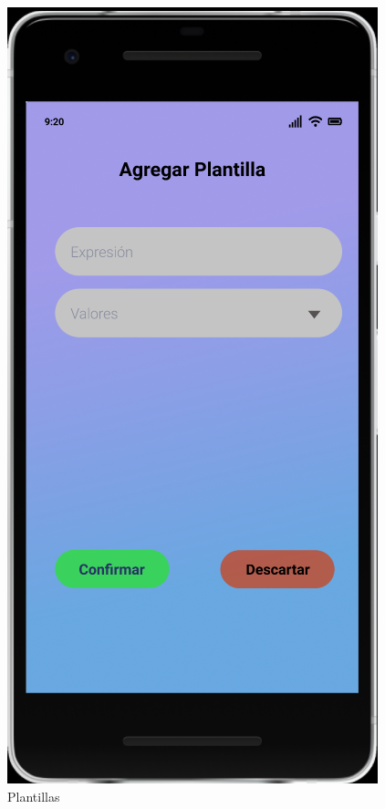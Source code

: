 \documentclass{article}
\begin{document}
\begin{figure}[H]
    \centering
    \includegraphics[scale=0.8]{imgs/Figma/Plantilla}
    \caption{Plantillas}
\end{figure}
\end{document}
